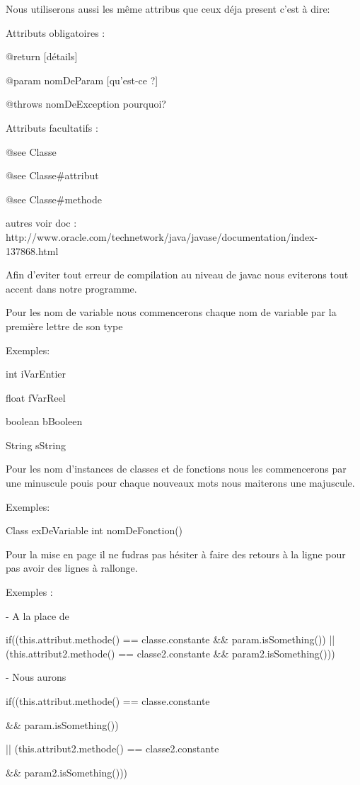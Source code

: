 Nous utiliserons aussi les même attribus que ceux déja present c'est à dire:

\begin{flushleft}
 Attributs obligatoires :
\end{flushleft}

    @return [détails]

    @param nomDeParam [qu'est-ce ?]

    @throws nomDeException pourquoi?

\begin{flushleft}
 Attributs facultatifs :
\end{flushleft}

    @see Classe

    @see Classe\#attribut

    @see Classe\#methode

    autres voir doc :  http://www.oracle.com/technetwork/java/javase/documentation/index-137868.html

\begin{flushleft}
 Afin d'eviter tout erreur de compilation au niveau de javac nous eviterons tout accent dans notre programme.
\end{flushleft}

\begin{flushleft}
 Pour les nom de variable nous commencerons chaque nom de variable par la première lettre de son type

 Exemples:
\end{flushleft}

   int iVarEntier 

   float fVarReel

   boolean bBooleen

   String sString

\begin{flushleft}
 Pour les nom d'instances de classes et de fonctions nous les commencerons par une minuscule pouis pour chaque nouveaux mots nous maiterons une majuscule.

 Exemples:
\end{flushleft}

   Class exDeVariable
   int nomDeFonction()

\begin{flushleft}
 Pour la mise en page il ne fudras pas hésiter à faire des retours à la ligne pour pas avoir des lignes à rallonge.

 Exemples :

   - A la place de
\end{flushleft}

      if((this.attribut.methode() == classe.constante \&\& param.isSomething()) || (this.attribut2.methode() == classe2.constante \&\& param2.isSomething()))

\begin{flushleft}
    - Nous aurons
\end{flushleft}

      if((this.attribut.methode() == classe.constante

    	\&\& param.isSomething())

        || (this.attribut2.methode() == classe2.constante

        \&\& param2.isSomething()))